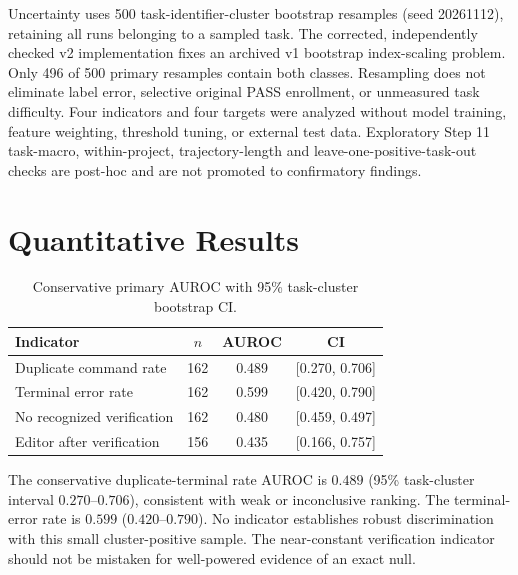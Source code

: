 \documentclass[journal]{IEEEtran}
\begin{document}
Uncertainty uses 500 task-identifier-cluster bootstrap resamples (seed 20261112), retaining all runs belonging to a sampled task. The corrected, independently checked v2 implementation fixes an archived v1 bootstrap index-scaling problem. Only 496 of 500 primary resamples contain both classes. Resampling does not eliminate label error, selective original PASS enrollment, or unmeasured task difficulty. Four indicators and four targets were analyzed without model training, feature weighting, threshold tuning, or external test data. Exploratory Step 11 task-macro, within-project, trajectory-length and leave-one-positive-task-out checks are post-hoc and are not promoted to confirmatory findings.

\section{Quantitative Results}
\begin{table}[t]
\centering
\caption{Conservative primary AUROC with 95\% task-cluster bootstrap CI.}
\label{tab:primary}
\begin{tabular}{lccc}
\toprule
Indicator & $n$ & AUROC & CI\\
\midrule
Duplicate command rate &162&0.489&[0.270, 0.706]\\
Terminal error rate &162&0.599&[0.420, 0.790]\\
No recognized verification &162&0.480&[0.459, 0.497]\\
Editor after verification &156&0.435&[0.166, 0.757]\\
\bottomrule
\end{tabular}
\end{table}

The conservative duplicate-terminal rate AUROC is $0.489$ (95\% task-cluster interval $0.270$--$0.706$), consistent with weak or inconclusive ranking. The terminal-error rate is $0.599$ ($0.420$--$0.790$). No indicator establishes robust discrimination with this small cluster-positive sample. The near-constant verification indicator should not be mistaken for well-powered evidence of an exact null.

\begin{table}[t]
\centering
\caption{Frozen indicators under four different provisional targets.}
\label{tab:sens}
\end{table}
\end{document}
